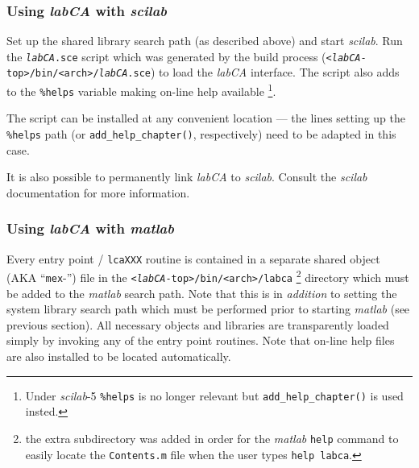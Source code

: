 \documentclass{article}
\newcommand{\sca}{\ita{labCA}}
\newcommand{\scilab}{\ita{scilab}}
\newcommand{\matlab}{\ita{matlab}}
\newcommand{\com}[1]{{\tt #1}}
\newcommand{\ita}[1]{\emph{#1}}
\begin{document}
\subsubsection{Using \sca{} with \scilab}
Set up the shared library search path (as described above) and start
\scilab. Run the \com{\sca.sce} script which was generated by the build process
(\com{<\sca-top>/bin/<arch>/\sca.sce}) to load the \sca{} interface.
The script also adds to the \com{\%helps} variable making on-line
help available%
\footnote{
Under \scilab{-5} \com{\%helps} is no longer relevant
but \com{add\_help\_chapter()} is used insted.
}.

The script can be installed at any convenient location --- the lines
setting up the \com{\%helps} path (or \com{add\_help\_chapter()}, respectively)
need to be adapted in this case.

It is also possible to permanently link \sca{} to \scilab{}. Consult
the \scilab{} documentation for more information.

\subsubsection{Using \sca{} with \matlab}
Every entry point / \com{lcaXXX} routine 
is contained in a separate
shared object (AKA ``\com{mex}-'') file in the \com{<\sca-top>/bin/<arch>/labca}%
\footnote{
the extra subdirectory was added in order for the \matlab{} \com{help} command
to easily locate the \com{Contents.m} file when the user types \com{help labca}.
} directory
which must be added to the \matlab{} search path.
Note that this is in \ita{addition}
to setting the system library search path which must be performed prior
to starting \matlab{} (see previous section).
All necessary objects and libraries are transparently loaded simply
by invoking any of the entry point routines. Note that on-line help
files are also installed to be located automatically.
\end{document}
